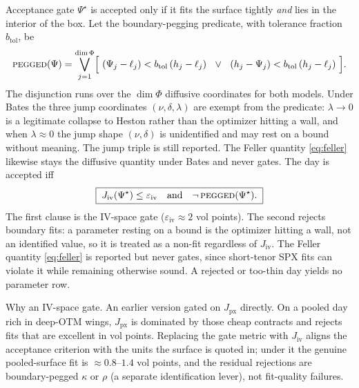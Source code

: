 \documentclass[a4paper, 11pt, reqno]{amsart}
\makeatletter
\def\section{\@startsection{section}{1}%
	\z@{.7\linespacing\@plus\linespacing}{.5\linespacing}%
	{\normalfont\bfseries\centering}}
\def\paragraph{\@startsection{paragraph}{4}%
	\z@\z@{-\fontdimen2\font}%
	{\normalfont\bfseries}}
\newcommand{\ConstIvGateSym}{\varepsilon_{\mathrm{iv}}}  \newcommand{\ConstIvGateVal}{0.02}
\newcommand{\ConstBoundTolSym}{b_{\mathrm{tol}}}         \newcommand{\ConstBoundTolVal}{10^{-3}}
\makeatother
\begin{document}
	\section{Acceptance gate}\label{sec:gate}
		$\Psi^\star$ is accepted only if it fits the surface tightly \emph{and} lies in the interior
		of the box. Let the boundary-pegging predicate, with tolerance fraction $\ConstBoundTolSym$, be
		\begin{equation}\label{eq:pegged}
			\textsc{pegged}(\Psi)
			= \bigvee_{j=1}^{\dim\Phi}
			\Bigl[\ (\Psi_j - \ell_j) < \ConstBoundTolSym\,(h_j-\ell_j)
			\ \ \vee\ \
			(h_j - \Psi_j) < \ConstBoundTolSym\,(h_j-\ell_j) \ \Bigr].
		\end{equation}
		The disjunction runs over the $\dim\Phi$ diffusive coordinates for both models. Under Bates the three jump
		coordinates $(\nu,\delta,\lambda)$ are exempt from the predicate: $\lambda\to0$ is a legitimate
		collapse to Heston rather than the optimizer hitting a wall, and when $\lambda\approx0$ the jump
		shape $(\nu,\delta)$ is unidentified and may rest on a bound without meaning. The jump triple is
		still reported. The Feller quantity \eqref{eq:feller} likewise stays the diffusive quantity under
		Bates and never gates.
		The day is accepted iff
		\begin{equation}\label{eq:accept}
			\boxed{\;
			J_{\mathrm{iv}}(\Psi^\star) \le \ConstIvGateSym
			\quad\text{and}\quad
			\lnot\,\textsc{pegged}(\Psi^\star).
			\;}
		\end{equation}
		The first clause is the IV-space gate ($\ConstIvGateSym\approx 2$ vol points). The
		second rejects boundary fits: a parameter resting on a bound is the optimizer hitting a wall,
		not an identified value, so it is treated as a non-fit regardless of $J_{\mathrm{iv}}$. The
		Feller quantity \eqref{eq:feller} is reported but never gates, since short-tenor SPX fits can
		violate it while remaining otherwise sound. A rejected or too-thin day yields no parameter
		row.
		
		\paragraph{Why an IV-space gate.} An earlier version gated on $J_{\mathrm{px}}$ directly. On a
		pooled day rich in deep-OTM wings, $J_{\mathrm{px}}$ is dominated by those cheap contracts and
		rejects fits that are excellent in vol points. Replacing the gate metric with
		$J_{\mathrm{iv}}$ aligns the acceptance criterion with the units the surface is quoted in;
		under it the genuine pooled-surface fit is $\approx 0.8$--$1.4$ vol points, and the residual
		rejections are boundary-pegged $\kappa$ or $\rho$ (a separate identification lever), not
		fit-quality failures.
		
\end{document}
